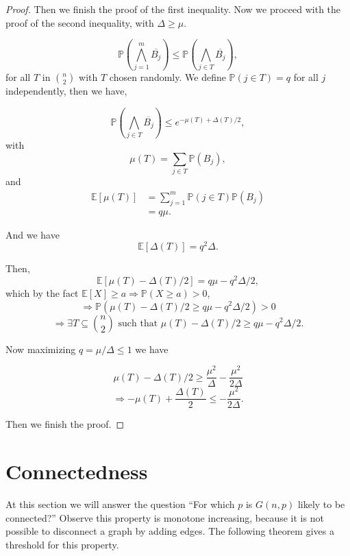 \documentclass[12pt,twoside,a4paper,bibliography=totocnumbered]{book}
\numberwithin{equation}{section}
\theoremstyle{remark}
\begin{document}
\begin{proof}
Then we finish the proof of the first inequality. Now we proceed with the proof of the second inequality, with $\Delta \geq \mu$.

$$\mathbb{P}(\bigwedge_{j=1}^m \overline{B_j}) \leq \mathbb{P}(\bigwedge_{j \in T} \overline{B_j}),$$
for all $T$ in $\binom{n}{2}$ with $T$ chosen randomly. We define $\mathbb{P}(j \in T) = q$ for all $j$ independently, then we have,

$$ \mathbb{P}(\bigwedge_{j \in T} \overline{B_j}) \leq e^{- \mu(T) + \Delta(T)/2},$$
with
 $$\mu(T) = \sum_{j \in T} \mathbb{P}(B_j),$$
 and
 \begin{align*}
 \mathbb{E} [\mu(T)] &= \sum^m_{j=1} \mathbb{P}(j\in T) \mathbb{P} (B_j)\\
& = q\mu .
 \end{align*}

And we have
 $$ \mathbb{E}[\Delta(T)] = q^2\Delta.$$
 
 Then,
 $$\mathbb{E}[\mu(T) - \Delta(T)/2] = q\mu - q^2 \Delta/2,$$
 which by the fact $\mathbb{E}[X] \geq a \Rightarrow \mathbb{P}(X\geq a) > 0$,
 $$\Rightarrow \mathbb{P}(\mu(T) - \Delta(T)/2 \geq q\mu - q^2 \Delta / 2) > 0$$
 $$\Rightarrow \exists T \subseteq \binom{n}{2}\text{ such that } \mu(T) - \Delta(T)/2 \geq q\mu - q^2 \Delta / 2 .$$
 
Now maximizing $q = \mu / \Delta \leq 1$ we have

 $$ \mu(T) - \Delta(T)/2 \geq \frac{\mu^2}{\Delta} - \frac{\mu^2}{2\Delta}$$
 $$\Rightarrow -\mu(T) + \frac{\Delta(T)}{2} \leq -\frac{\mu^2}{2\Delta}.$$
 
 Then we finish the proof.
 
\end{proof}

\section{Connectedness}
At this section we will answer the question ``For which $p$ is $G(n,p)$ likely to be connected?'' Observe this property is monotone increasing, because it is not possible to disconnect a graph by adding edges. The following theorem gives a threshold for this property.
\end{document}

